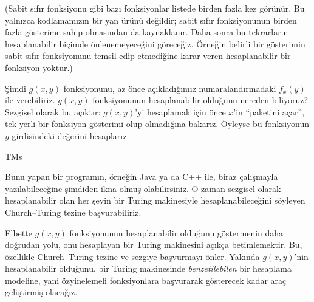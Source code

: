 \documentclass[../../../include/open-logic-section]{subfiles}
\begin{document}
(Sabit sıfır fonksiyonu gibi bazı fonksiyonlar listede birden fazla kez
görünür. Bu yalnızca kodlamamızın bir yan ürünü değildir; sabit sıfır
fonksiyonunun birden fazla gösterime sahip olmasından da kaynaklanır. Daha
sonra bu tekrarların hesaplanabilir biçimde önlenemeyeceğini göreceğiz.
Örneğin belirli bir gösterimin sabit sıfır fonksiyonunu temsil edip etmediğine
karar veren hesaplanabilir bir fonksiyon yoktur.)

Şimdi $g(x,y)$ fonksiyonunu, az önce açıkladığımız numaralandırmadaki
$f_x(y)$ ile verebiliriz. $g(x,y)$ fonksiyonunun hesaplanabilir olduğunu
nereden biliyoruz? Sezgisel olarak bu açıktır: $g(x,y)$'yi hesaplamak için
önce $x$'in ``paketini açar'', tek yerli bir fonksiyon gösterimi olup
olmadığına bakarız. Öyleyse bu fonksiyonun $y$ girdisindeki değerini
hesaplarız.

\begin{tagblock}{TMs}
\begin{digress}
Bunu yapan bir programın, örneğin Java ya da C++ ile, biraz çalışmayla
yazılabileceğine şimdiden ikna olmuş olabilirsiniz. O zaman sezgisel olarak
hesaplanabilir olan her şeyin bir Turing makinesiyle hesaplanabileceğini
söyleyen Church--Turing tezine başvurabiliriz.

Elbette $g(x,y)$ fonksiyonunun hesaplanabilir olduğunu göstermenin daha
doğrudan yolu, onu hesaplayan bir Turing makinesini açıkça betimlemektir. Bu,
özellikle Church--Turing tezine ve sezgiye başvurmayı önler. Yakında
$g(x,y)$'nin hesaplanabilir olduğunu, bir Turing makinesinde
\emph{benzetilebilen} bir hesaplama modeline, yani özyinelemeli fonksiyonlara
başvurarak gösterecek kadar araç geliştirmiş olacağız.
\end{digress}
\end{tagblock}
\end{document}
